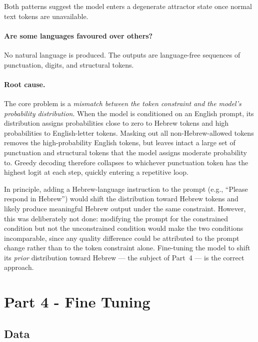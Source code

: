 \documentclass[11pt, a4paper]{article}
\begin{document}
Both patterns suggest the model enters a degenerate attractor state once normal
text tokens are unavailable.

\paragraph{Are some languages favoured over others?}
No natural language is produced. The outputs are language-free sequences of
punctuation, digits, and structural tokens.

\paragraph{Root cause.}
The core problem is a \emph{mismatch between the token constraint and the
model's probability distribution}.
When the model is conditioned on an English prompt, its distribution assigns
probabilities close to zero to Hebrew tokens and high probabilities to
English-letter tokens.
Masking out all non-Hebrew-allowed tokens removes the high-probability English
tokens, but leaves intact a large set of punctuation and structural tokens that
the model assigns moderate probability to.
Greedy decoding therefore collapses to whichever punctuation token has the
highest logit at each step, quickly entering a repetitive loop.

In principle, adding a Hebrew-language instruction to the prompt (e.g.,
``Please respond in Hebrew'') would shift the distribution toward Hebrew tokens
and likely produce meaningful Hebrew output under the same constraint.
However, this was deliberately not done: modifying the prompt for the
constrained condition but not the unconstrained condition would make the two
conditions incomparable, since any quality difference could be attributed to the
prompt change rather than to the token constraint alone.
Fine-tuning the model to shift its \emph{prior} distribution toward Hebrew ---
the subject of Part~4 --- is the correct approach.

\newpage
\section{Part 4 - Fine Tuning}

\subsection{Data}
\end{document}
